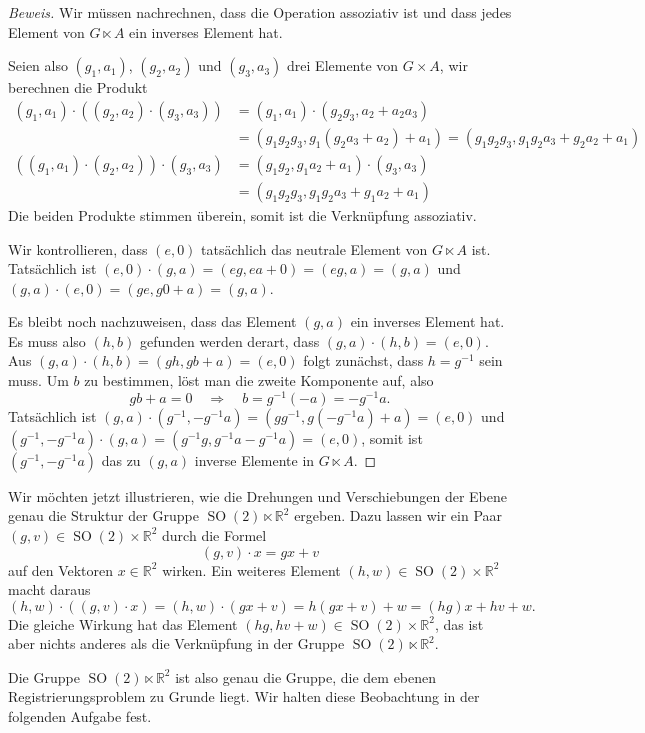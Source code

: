 \begin{proof}[Beweis]
Wir müssen nachrechnen, dass die Operation assoziativ ist und dass
jedes Element von $G\ltimes A$ ein inverses Element hat.

Seien also $(g_1,a_1)$, $(g_2,a_2)$ und $(g_3,a_3)$ drei Elemente von
$G\times A$, wir berechnen die Produkt
\begin{align*}
(g_1,a_1)\cdot((g_2,a_2)\cdot(g_3,a_3))
&=
(g_1,a_1)\cdot(g_2g_3,a_2+a_2a_3)
\\
&=
(g_1g_2g_3,g_1(g_2a_3+a_2)+a_1)
=
(g_1g_2g_3,g_1g_2a_3+g_2a_2+a_1)
\\
((g_1,a_1)\cdot(g_2,a_2))\cdot(g_3,a_3)
&=
(g_1g_2,g_1a_2+a_1)\cdot(g_3,a_3)
\\
&=
(g_1g_2g_3, g_1g_2a_3+g_1a_2+a_1)
\end{align*}
Die beiden Produkte stimmen überein, somit ist die Verknüpfung assoziativ.

Wir kontrollieren, dass $(e,0)$ tatsächlich das neutrale Element
von $G\ltimes A$ ist.
Tatsächlich ist $(e,0)\cdot (g,a)=(eg,ea+0)=(eg,a)=(g,a)$ und
$(g,a)\cdot(e,0)=(ge,g0+a)=(g,a)$.

Es bleibt noch nachzuweisen, dass das Element $(g,a)$ ein inverses Element
hat.
Es muss also $(h,b)$ gefunden werden derart, dass $(g,a)\cdot (h,b)=(e,0)$.
Aus $(g,a)\cdot(h,b)=(gh,gb+a)=(e,0)$ folgt zunächst, dass $h=g^{-1}$ sein
muss.
Um $b$ zu bestimmen, löst man die zweite Komponente auf, also
\[
gb+a=0
\quad\Rightarrow\quad
b=g^{-1}(-a)=-g^{-1}a.
\]
Tatsächlich ist $(g,a)\cdot(g^{-1},-g^{-1}a)=(gg^{-1},g(-g^{-1}a)+a)=(e,0)$
und $(g^{-1},-g^{-1}a)\cdot (g,a)=(g^{-1}g, g^{-1}a-g^{-1}a)=(e,0)$,
somit ist $(g^{-1},-g^{-1}a)$ das zu $(g,a)$ inverse Elemente in $G\ltimes A$.
\end{proof}

Wir möchten jetzt illustrieren, wie die Drehungen und Verschiebungen
der Ebene genau die Struktur der Gruppe
$\operatorname{SO}(2)\ltimes\mathbb{R}^2$ ergeben.
Dazu lassen wir ein Paar $(g,v)\in\operatorname{SO}(2)\times \mathbb{R}^2$
durch die Formel
\[
(g,v)\cdot x
=
gx + v
\]
auf den Vektoren $x\in \mathbb{R}^2$ wirken.
Ein weiteres Element $(h,w)\in\operatorname{SO}(2)\times\mathbb{R}^2$
macht daraus
\[
(h,w)\cdot ((g,v)\cdot x)
=
(h,w)\cdot (gx+v)
=
h(gx+v)+w
=
(hg)x + hv + w.
\]
Die gleiche Wirkung hat das Element
$(hg, hv+w)\in\operatorname{SO}(2)\times\mathbb{R}^2$,
das ist aber nichts anderes als die Verknüpfung in der Gruppe
$\operatorname{SO}(2)\ltimes \mathbb{R}^2$.

Die Gruppe $\operatorname{SO}(2)\ltimes\mathbb{R}^2$ ist also genau
die Gruppe, die dem ebenen Registrierungsproblem zu Grunde liegt.
Wir halten diese Beobachtung in der folgenden Aufgabe fest.

